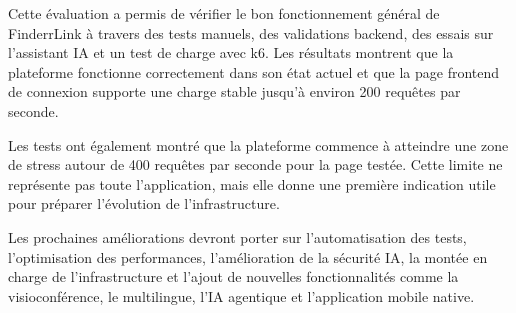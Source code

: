 Cette évaluation a permis de vérifier le bon fonctionnement général de FinderrLink à travers des tests manuels, des validations backend, des essais sur l'assistant IA et un test de charge avec k6. Les résultats montrent que la plateforme fonctionne correctement dans son état actuel et que la page frontend de connexion supporte une charge stable jusqu'à environ 200 requêtes par seconde.

Les tests ont également montré que la plateforme commence à atteindre une zone de stress autour de 400 requêtes par seconde pour la page testée. Cette limite ne représente pas toute l'application, mais elle donne une première indication utile pour préparer l'évolution de l'infrastructure.

Les prochaines améliorations devront porter sur l'automatisation des tests, l'optimisation des performances, l'amélioration de la sécurité IA, la montée en charge de l'infrastructure et l'ajout de nouvelles fonctionnalités comme la visioconférence, le multilingue, l'IA agentique et l'application mobile native.
